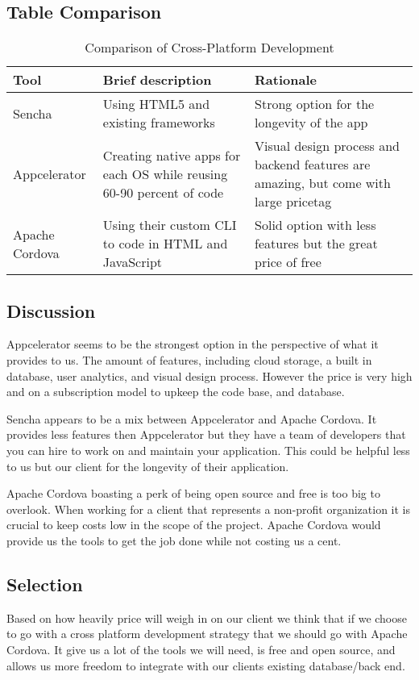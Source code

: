 \documentclass[letterpaper,10pt,draftclsnofoot,onecolumn,titlepage]{IEEEtran}
\begin{document}
	\subsection{Table Comparison}
	\begin{table}[ht]
	\caption{Comparison of Cross-Platform Development}
	\begin{center}
	\begin{tabular} { | m{3cm} | m{5cm} | m{5cm} | }
	\hline\hline
	Tool & Brief description & Rationale \\ [0.5ex]
	\hline
	Sencha & Using HTML5 and existing frameworks & Strong option for the longevity of the app\\
	\hline
	Appcelerator & Creating native apps for each OS while reusing 60-90 percent of code & Visual design process and backend features are amazing, but come with large pricetag\\
	\hline
	Apache Cordova & Using their custom CLI to code in HTML and JavaScript & Solid option with less features but the great price of free\\
	\hline

	\end{tabular}
	\end{center}
	\end{table}
	\subsection{Discussion}
	Appcelerator seems to be the strongest option in the perspective of what it provides to us. The amount of features, including cloud storage, a built in database, user analytics, and visual design process. However the price is very high and on a subscription model to upkeep the code base, and database.

	Sencha appears to be a mix between Appcelerator and Apache Cordova. It provides less features then Appcelerator but they have a team of developers that you can hire to work on and maintain your application. This could be helpful less to us but our client for the longevity of their application.

	Apache Cordova boasting a perk of being open source and free is too big to overlook. When working for a client that represents a non-profit organization it is crucial to keep costs low in the scope of the project. Apache Cordova would provide us the tools to get the job done while not costing us a cent.

	\subsection{Selection}
	Based on how heavily price will weigh in on our client we think that if we choose to go with a cross platform development strategy that we should go with Apache Cordova. It give us a lot of the tools we will need, is free and open source, and allows us more freedom to integrate with our clients existing database/back end.
\end{document}
